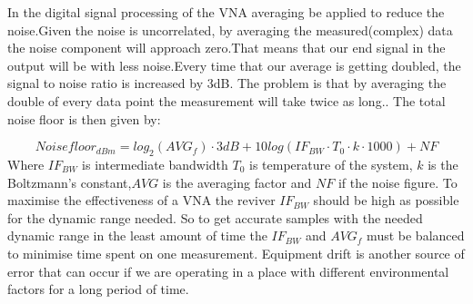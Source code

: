 In the digital signal processing of the \gls{VNA} averaging be applied to reduce the noise.Given the noise is uncorrelated, by averaging the measured(complex) data the noise component will approach zero.That means that our end signal in the output will be with less noise.Every time that our average is getting doubled, the signal to noise ratio is increased by 3dB. The problem is that by averaging the double of every data point the measurement will take twice as long.\citep{KeysightAVG}. The total noise floor is then given by:

\begin{equation}
Noisefloor_{dBm} = log_{2}(AVG_f)\cdot 3dB +10log(IF_{BW}\cdot T_{0}\cdot k\cdot 1000) + NF 
\label{NFwithAVG}
\end{equation}
Where $IF_{BW}$ is  intermediate bandwidth $T_0$ is temperature of the system, $k$ is the Boltzmann's constant,$AVG$ is the averaging factor and $NF$ if the noise figure.
To maximise the effectiveness of a \gls{VNA} the reviver $IF_{BW}$ should be high as possible for the dynamic range needed. So to get accurate samples with the needed dynamic range in the least amount of time the $IF_{BW}$ and $AVG_f$ must be balanced to minimise time spent on one measurement.
Equipment drift is another source of error that can occur if we are operating in a place with different environmental factors for a long period of time.




